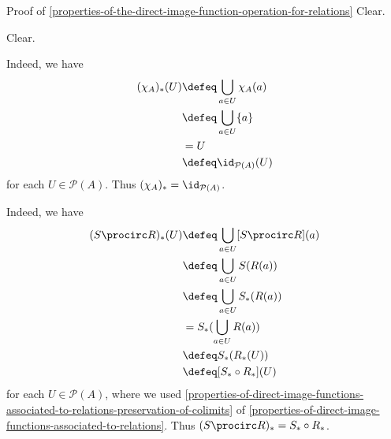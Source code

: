 \begin{Proof}{Proof of \cref{properties-of-the-direct-image-function-operation-for-relations}}%
    Clear.

    Clear.

    Indeed, we have
    \begin{align*}
        (\chi_{A})_{*}(U) &\defeq \bigcup_{a\in U}\chi_{A}(a)\\
                          &\defeq \bigcup_{a\in U}\{a\}\\
                          &=      U\\
                          &\defeq \id_{\mathcal{P}(A)}(U)
    \end{align*}
    for each $U\in\mathcal{P}(A)$. Thus $(\chi_{A})_{*}=\id_{\mathcal{P}(A)}$.

    Indeed, we have
    \begin{align*}
        (S\procirc R)_{*}(U) &\defeq \bigcup_{a\in U}[S\procirc R](a)\\
                             &\defeq \bigcup_{a\in U}S(R(a))\\
                             &\defeq \bigcup_{a\in U}S_{*}(R(a))\\
                             &=      S_{*}(\bigcup_{a\in U}R(a))\\
                             &\defeq S_{*}(R_{*}(U))\\
                             &\defeq [S_{*}\circ R_{*}](U)
    \end{align*}
    for each $U\in\mathcal{P}(A)$, where we used \cref{properties-of-direct-image-functions-associated-to-relations-preservation-of-colimits} of \cref{properties-of-direct-image-functions-associated-to-relations}. Thus $(S\procirc R)_{*}=S_{*}\circ R_{*}$.
\end{Proof}
